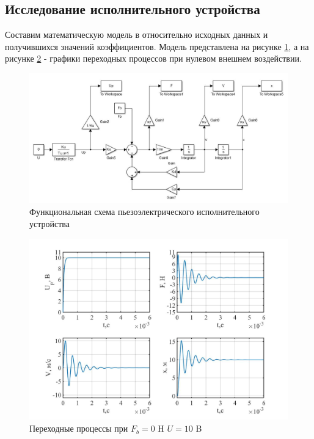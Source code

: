 \documentclass[a4paper, 12pt]{article}
\begin{document}
\newpage

\begin{center}
	\section{Исследование исполнительного устройства}
\end{center}

Составим математическую модель в относительно исходных данных и получившихся значений коэффициентов. Модель представлена на рисунке \ref{funkshem}, а на рисунке \ref{begin} - графики переходных процессов при нулевом внешнем воздействии. 

\begin{figure}[h!]
	\centering
	\includegraphics[width = 0.6\textheight]{funkshem}
	\caption{Функциональная схема пьезоэлектрического исполнительного устройства}
	\label{funkshem}
\end{figure}

\begin{figure}[h!]
	\centering
	\includegraphics[width = 0.65\textheight]{data/begin}
	\caption{Переходные процессы при $F_b=0$ H $U=10$ B}
	\label{begin}
\end{figure}
\end{document}
